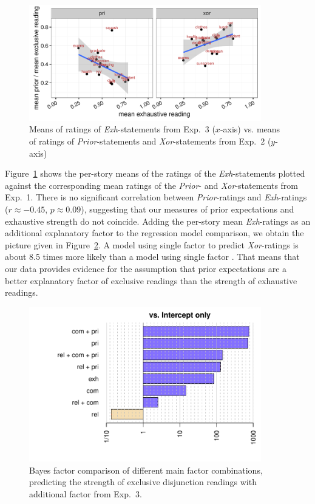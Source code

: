 \documentclass[12pt]{article}
\begin{document}
\begin{figure}
  \centering
  \includegraphics[width=0.9\textwidth]{pics_02/correlationExhXorPri.pdf}
  \caption{Means of ratings of \emph{Exh}-statements from Exp.~3 ($x$-axis) vs. means of
    ratings of \emph{Prior}-statements and \emph{Xor}-statements from
    Exp.~2 ($y$-axis)}
\label{fig:CorrelationExp1Exp4}
\end{figure}

Figure~\ref{fig:CorrelationExp1Exp4} shows the per-story means of the ratings of the
\emph{Exh}-statements plotted against the corresponding mean ratings of the \emph{Prior}- and
\emph{Xor}-statements from Exp.~1. There is no significant correlation between
\emph{Prior}-ratings and \emph{Exh}-ratings ($r \approx -0.45$, $p \approx 0.09$), suggesting
that our measures of prior expectations and exhaustive strength do not coincide. Adding the
per-story mean \emph{Exh}-ratings as an additional explanatory factor \exh to the regression
model comparison, we obtain the picture given in Figure~\ref{fig:BayesFactorsExp4}. A model
using single factor \pri to predict \emph{Xor}-ratings is about 8.5 times more likely than a
model using single factor \exh. That means that our data provides evidence for the assumption
that prior expectations are a better explanatory factor of exclusive readings than the strength
of exhaustive readings.

\begin{figure}
  \centering
  \includegraphics[width=0.9\textwidth]{pics/bfsAllExp4.pdf}
  \caption{Bayes factor comparison of different main factor combinations, predicting the
    strength of exclusive disjunction readings with additional factor \exh from Exp.~3.}
\label{fig:BayesFactorsExp4}
\end{figure}
\end{document}
